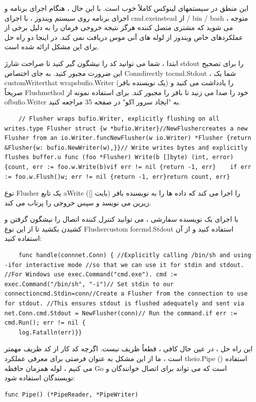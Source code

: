 \documentclass[12pt]{book}
\begin{document}
{این منطق در سیستمهای لینوکس کاملاً خوب است. با این حال ، هنگام اجرای برنامه و اجرای برنامه روی سیستم ویندوز ، با اجرای cmd.exeinstead از / bin / bash ، متوجه می شوید که مشتری متصل کننده هرگز نتیجه خروجی فرمان را به دلیل برخی از عملکردهای خاص ویندوز از لوله های آنی موس دریافت نمی کند. در اینجا دو راه حل برای این مشکل ارائه شده است.

ابتدا ، شما می توانید کد را نیشگون گیر کنید تا صراحت شارژ stdout را برای تصحیح این ضرورت مجبور کنید. به جای اختصاص Conndirectly tocmd.Stdout ، شما یک customWriterthat wrapsbufio.Writer (یک نویسنده بافر) را یادداشت می کنید و صریحاً Flushmethod خود را صدا می زنید تا بافر را مجبور کند. برای استفاده نمونه از ofbufio.Writer به "ایجاد سرور اکو" در صفحه 35 مراجعه کنید.
\begin{latin}
	\begin{lstlisting}
	// Flusher wraps bufio.Writer, explicitly flushing on all writes.type Flusher struct {w *bufio.Writer}//NewFlushercreates a new Flusher from an io.Writer.funcNewFlusher(w io.Writer) *Flusher {return &Flusher{w: bufio.NewWriter(w),}}// Write writes bytes and explicitly flushes buffer.u func (foo *Flusher) Write(b []byte) (int, error) {count, err := foo.w.Write(b)vif err != nil {return -1, err}    if err := foo.w.Flush()w; err != nil {return -1, err}return count, err}
	\end{lstlisting}
\end{latin}

نوع Flusher یک تابع aWrite ([] بایت) را اجرا می کند که داده ها را به نویسنده بافر زیرین می نویسد و سپس خروجی را پرتاب می کند.

با اجرای یک نویسنده سفارشی ، می توانید کنترل کننده اتصال را نیشگون گرفتن و کشیدن بکشید تا از این نوع Flushercustom forcmd.Stdout استفاده کنید و از آن استفاده کنید:
\begin{latin}
	\begin{lstlisting}
	func handle(connnet.Conn) { //Explicitly calling /bin/sh and using -ifor interactive mode //so that we can use it for stdin and stdout. //For Windows use exec.Command("cmd.exe"). cmd := exec.Command("/bin/sh", "-i")// Set stdin to our connectioncmd.Stdin=conn//Create a Flusher from the connection to use for stdout. //This ensures stdout is flushed adequately and sent via net.Conn.cmd.Stdout = NewFlusher(conn)// Run the command.if err := cmd.Run(); err != nil {
	log.Fatalln(err)}}
	\end{lstlisting}
\end{latin}

این راه حل ، در عین حال کافی ، قطعاً ظریف نیست. اگرچه کد کار از کد ظریف مهمتر است ، ما از این مشکل به عنوان فرصتی برای معرفی عملکرد theio.Pipe () استفاده می کنیم ، لوله همزمان حافظه Go است که می تواند برای اتصال خوانندگان و نویسندگان استفاده شود:
\begin{latin}
	\begin{lstlisting}
func Pipe() (*PipeReader, *PipeWriter)
	\end{lstlisting}
\end{latin}

}
\end{document}
